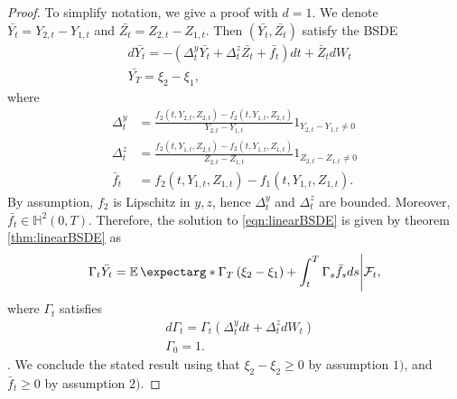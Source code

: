 \begin{proof}
	To simplify notation, we give a proof with $d=1$.
	We denote $\bar{Y_t}=Y_{2,t}-Y_{1,t}$ and $\bar{Z_t}=Z_{2,t}-Z_{1,t}$. Then $(\bar{Y_t},\bar{Z_t})$ satisfy the BSDE
\begin{equation}
	\label{eqn:linearBSDE}
	\begin{split}
		&d \bar{Y_t}=-\left(\Delta_t^y \bar{Y_t}+\Delta_t^z \bar{Z_t}+\bar{f_t}\right) d t+\bar{Z}_t dW_t\\
		&\bar{Y_T}=\xi_2-\xi_1,
	\end{split}
\end{equation}
where 
\begin{equation}
	\begin{aligned}
		\Delta_t^y & =\frac{f_2\left(t, Y_{2,t}, Z_{2,t}\right)-f_2\left(t, Y_{1,t}, Z_{2,t}\right)}{Y_{2,t}-Y_{1,t}} 1_{Y_{2,t}-Y_{1,t} \neq 0} \\
		\Delta_t^z & =\frac{f_2\left(t, Y_{1,t}, Z_{2,t}\right)-f_2\left(t, Y_{1,t}, Z_{1,t}\right)}{Z_{2,t}-Z_{1,t}} 1_{Z_{2,t}-Z_{1,t} \neq 0} \\
		\bar{f}_t & =f_2\left(t, Y_{1,t}, Z_{1,t}\right)-f_1\left(t, Y_{1,t}, Z_{1,t}\right) .
	\end{aligned}
\end{equation}
By assumption, $f_2$ is Lipschitz in $y,z$, hence $\Delta_t^y$ and $\Delta_t^z$ are bounded. Moreover, $\bar{f_t}\in \mathbb{H}^2(0,T)$. Therefore, the solution to \eqref{eqn:linearBSDE} is given by theorem \ref{thm:linearBSDE} as
\begin{equation}
	\Gamma_t \bar{Y_t}=\expect*{\Gamma_T\left(\xi_2-\xi_1\right)+\int_t^T \Gamma_s \bar{f_s} d s \Bigg| \mathcal{F}_t},
\end{equation} 
where $\Gamma_t$ satisfies 
\begin{equation}
	\begin{split}
		&d\Gamma_t=\Gamma_{t}(\Delta_t^y dt + \Delta_t^z dW_t )\\
		&\Gamma_0=1.
	\end{split}
\end{equation}
. We conclude the stated result using that $\xi_2-\xi_2\geq 0$ by assumption $1)$, and $\bar{f}_t\geq 0$ by assumption $2)$.

\end{proof}
